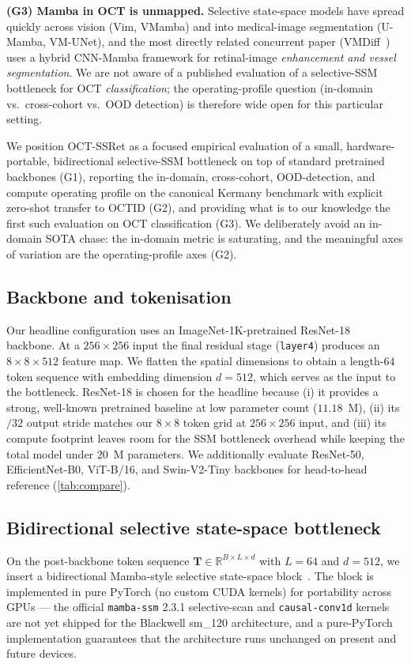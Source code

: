 \documentclass[5p]{elsarticle}
\begin{document}
\textbf{(G3) Mamba in OCT is unmapped.} Selective state-space models have spread quickly across vision (Vim, VMamba) and into medical-image segmentation (U-Mamba, VM-UNet), and the most directly related concurrent paper (VMDiff~\citep{chan2026vmdiff}) uses a hybrid CNN-Mamba framework for retinal-image \emph{enhancement and vessel segmentation}. We are not aware of a published evaluation of a selective-SSM bottleneck for OCT \emph{classification}; the operating-profile question (in-domain vs.\ cross-cohort vs.\ OOD detection) is therefore wide open for this particular setting.

We position OCT-SSRet as a focused empirical evaluation of a small, hardware-portable, bidirectional selective-SSM bottleneck on top of standard pretrained backbones (G1), reporting the in-domain, cross-cohort, OOD-detection, and compute operating profile on the canonical Kermany benchmark with explicit zero-shot transfer to OCTID (G2), and providing what is to our knowledge the first such evaluation on OCT classification (G3). We deliberately avoid an in-domain SOTA chase: the in-domain metric is saturating, and the meaningful axes of variation are the operating-profile axes (G2).

\subsection{Backbone and tokenisation}
\label{sec:backbone}
Our headline configuration uses an ImageNet-1K-pretrained ResNet-18~\citep{he2016resnet} backbone. At a $256\times 256$ input the final residual stage (\texttt{layer4}) produces an $8\times 8\times 512$ feature map. We flatten the spatial dimensions to obtain a length-$64$ token sequence with embedding dimension $d=512$, which serves as the input to the bottleneck. ResNet-18 is chosen for the headline because (i) it provides a strong, well-known pretrained baseline at low parameter count ($11.18$~M), (ii) its $/32$ output stride matches our $8\times 8$ token grid at $256\times 256$ input, and (iii) its compute footprint leaves room for the SSM bottleneck overhead while keeping the total model under $20$~M parameters. We additionally evaluate ResNet-50, EfficientNet-B0, ViT-B/16, and Swin-V2-Tiny backbones for head-to-head reference (\cref{tab:compare}).

\subsection{Bidirectional selective state-space bottleneck}
\label{sec:ssm}
On the post-backbone token sequence $\mathbf{T} \in \mathbb{R}^{B \times L \times d}$ with $L=64$ and $d=512$, we insert a bidirectional Mamba-style selective state-space block~\citep{gu2023mamba,zhu2024vim}. The block is implemented in pure PyTorch (no custom CUDA kernels) for portability across GPUs --- the official \texttt{mamba-ssm} 2.3.1 selective-scan and \texttt{causal-conv1d} kernels are not yet shipped for the Blackwell sm\_120 architecture, and a pure-PyTorch implementation guarantees that the architecture runs unchanged on present and future devices.
\end{document}
